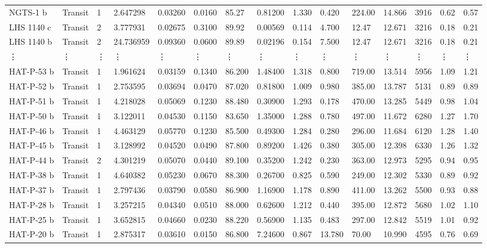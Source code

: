 \documentclass[11pt]{article}
\begin{document}
\begin{tabular}{lllllllllllllll}
	 NGTS-1 b     & Transit & 1 &  2.647298 & 0.03260 & 0.0160 & 85.27 & 0.81200 & 1.330 & 0.420 &  224.00 & 14.866 & 3916 & 0.62 & 0.57\\
	 LHS 1140 c   & Transit & 2 &  3.777931 & 0.02675 & 0.3100 & 89.92 & 0.00569 & 0.114 & 4.700 &   12.47 & 12.671 & 3216 & 0.18 & 0.21\\
	 LHS 1140 b   & Transit & 2 & 24.736959 & 0.09360 & 0.0600 & 89.89 & 0.02196 & 0.154 & 7.500 &   12.47 & 12.671 & 3216 & 0.18 & 0.21\\
	 ⋮ & ⋮ & ⋮ & ⋮ & ⋮ & ⋮ & ⋮ & ⋮ & ⋮ & ⋮ & ⋮ & ⋮ & ⋮ & ⋮ & ⋮\\
	 HAT-P-53 b & Transit & 1 &  1.961624 & 0.03159 & 0.1340 & 86.200 &  1.48400 & 1.318 &  0.800 &  719.00 & 13.514 & 5956 & 1.09 & 1.21\\
	 HAT-P-52 b & Transit & 1 &  2.753595 & 0.03694 & 0.0470 & 87.020 &  0.81800 & 1.009 &  0.980 &  385.00 & 13.787 & 5131 & 0.89 & 0.89\\
	 HAT-P-51 b & Transit & 1 &  4.218028 & 0.05069 & 0.1230 & 88.480 &  0.30900 & 1.293 &  0.178 &  470.00 & 13.285 & 5449 & 0.98 & 1.04\\
	 HAT-P-50 b & Transit & 1 &  3.122011 & 0.04530 & 0.1150 & 83.650 &  1.35000 & 1.288 &  0.780 &  497.00 & 11.672 & 6280 & 1.27 & 1.70\\
	 HAT-P-46 b & Transit & 1 &  4.463129 & 0.05770 & 0.1230 & 85.500 &  0.49300 & 1.284 &  0.280 &  296.00 & 11.684 & 6120 & 1.28 & 1.40\\
	 HAT-P-45 b & Transit & 1 &  3.128992 & 0.04520 & 0.0490 & 87.800 &  0.89200 & 1.426 &  0.380 &  305.00 & 12.398 & 6330 & 1.26 & 1.32\\
	 HAT-P-44 b & Transit & 2 &  4.301219 & 0.05070 & 0.0440 & 89.100 &  0.35200 & 1.242 &  0.230 &  363.00 & 12.973 & 5295 & 0.94 & 0.95\\
	 HAT-P-38 b & Transit & 1 &  4.640382 & 0.05230 & 0.0670 & 88.300 &  0.26700 & 0.825 &  0.590 &  249.00 & 12.302 & 5330 & 0.89 & 0.92\\
	 HAT-P-37 b & Transit & 1 &  2.797436 & 0.03790 & 0.0580 & 86.900 &  1.16900 & 1.178 &  0.890 &  411.00 & 13.262 & 5500 & 0.93 & 0.88\\
	 HAT-P-28 b & Transit & 1 &  3.257215 & 0.04340 & 0.0510 & 88.000 &  0.62600 & 1.212 &  0.440 &  395.00 & 12.872 & 5680 & 1.02 & 1.10\\
	 HAT-P-25 b & Transit & 1 &  3.652815 & 0.04660 & 0.0230 & 88.220 &  0.56900 & 1.135 &  0.483 &  297.00 & 12.842 & 5519 & 1.01 & 0.92\\
	 HAT-P-20 b & Transit & 1 &  2.875317 & 0.03610 & 0.0150 & 86.800 &  7.24600 & 0.867 & 13.780 &   70.00 & 10.990 & 4595 & 0.76 & 0.69\\

\end{tabular}
\end{document}
